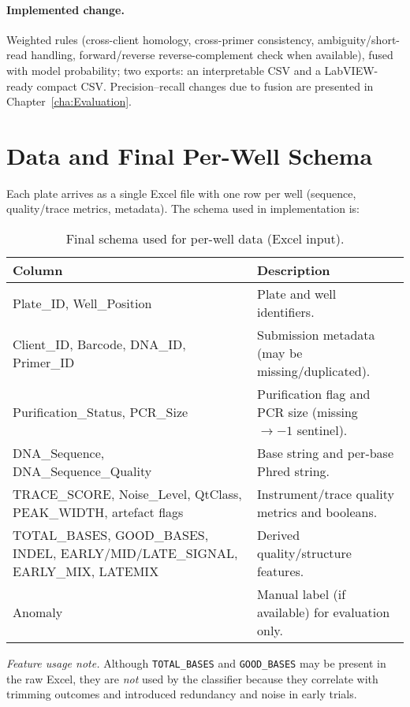 \paragraph{Implemented change.}
Weighted rules (cross-client homology, cross-primer consistency, ambiguity/short-read handling, forward/reverse reverse-complement check when available), fused with model probability; two exports: an interpretable CSV and a LabVIEW-ready compact CSV. Precision–recall changes due to fusion are presented in Chapter~\ref{cha:Evaluation}.

\section{Data and Final Per-Well Schema}
\label{sec:data_schema}
Each plate arrives as a single Excel file with one row per well (sequence, quality/trace metrics, metadata). The schema used in implementation is:

\begin{table}[H]
  \centering
  \caption{Final schema used for per-well data (Excel input).}
  \label{tab:final_table_schema_impl}
  \begin{tabular}{|l|p{11cm}|}
    \hline
    \textbf{Column} & \textbf{Description} \\ \hline
    Plate\_ID, Well\_Position & Plate and well identifiers. \\ \hline
    Client\_ID, Barcode, DNA\_ID, Primer\_ID & Submission metadata (may be missing/duplicated). \\ \hline
    Purification\_Status, PCR\_Size & Purification flag and PCR size (missing $\rightarrow -1$ sentinel). \\ \hline
    DNA\_Sequence, DNA\_Sequence\_Quality & Base string and per-base Phred string. \\ \hline
    TRACE\_SCORE, Noise\_Level, QtClass, PEAK\_WIDTH, artefact flags & Instrument/trace quality metrics and booleans. \\ \hline
    TOTAL\_BASES, GOOD\_BASES, INDEL, EARLY/MID/LATE\_SIGNAL, EARLY\_MIX, LATEMIX & Derived quality/structure features. \\ \hline
    Anomaly & Manual label (if available) for evaluation only. \\ \hline
  \end{tabular}
\end{table}

\noindent\textit{Feature usage note.} Although \texttt{TOTAL\_BASES} and \texttt{GOOD\_BASES} may be present in the raw Excel, they are \emph{not} used by the classifier because they correlate with trimming outcomes and introduced redundancy and noise in early trials.

